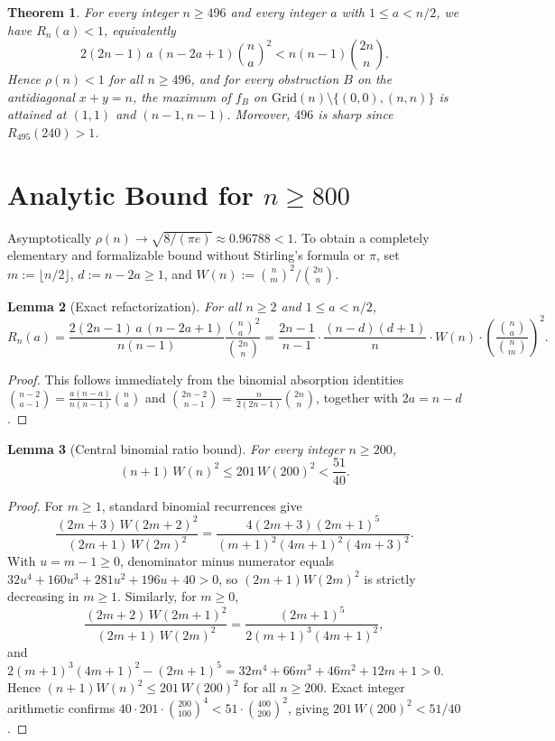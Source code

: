 \documentclass[11pt]{article}
\newtheorem{theorem}{Theorem}
\newtheorem{lemma}[theorem]{Lemma}
\begin{document}
\begin{theorem}\label{thm:main}
For every integer $n \ge 496$ and every integer $a$ with $1 \le a < n/2$, we have $R_n(a) < 1$, equivalently
\[
2(2n-1)\,a\,(n-2a+1)\binom{n}{a}^2 < n(n-1)\binom{2n}{n}.
\]
Hence $\rho(n) < 1$ for all $n \ge 496$, and for every obstruction $B$ on the antidiagonal $x+y=n$, the maximum of $f_B$ on $\mathrm{Grid}(n)\setminus\{(0,0),(n,n)\}$ is attained at $(1,1)$ and $(n-1,n-1)$. Moreover, $496$ is sharp since $R_{495}(240) > 1$.
\end{theorem}

\section{Analytic Bound for $n \ge 800$}
Asymptotically $\rho(n) \to \sqrt{8/(\pi e)} \approx 0.96788 < 1$. To obtain a completely elementary and formalizable bound without Stirling's formula or $\pi$, set $m := \lfloor n/2 \rfloor$, $d := n - 2a \ge 1$, and $W(n) := \binom{n}{m}^2 / \binom{2n}{n}$.

\begin{lemma}[Exact refactorization]\label{lem:ref}
For all $n \ge 2$ and $1 \le a < n/2$,
\[
R_n(a) = \frac{2(2n-1)\,a\,(n-2a+1)}{n(n-1)}\frac{\binom{n}{a}^2}{\binom{2n}{n}} = \frac{2n-1}{n-1}\cdot \frac{(n-d)(d+1)}{n}\cdot W(n)\cdot \left(\frac{\binom{n}{a}}{\binom{n}{m}}\right)^2.
\]
\end{lemma}
\begin{proof}
This follows immediately from the binomial absorption identities $\binom{n-2}{a-1} = \frac{a(n-a)}{n(n-1)}\binom{n}{a}$ and $\binom{2n-2}{n-1} = \frac{n}{2(2n-1)}\binom{2n}{n}$, together with $2a = n - d$.
\end{proof}

\begin{lemma}[Central binomial ratio bound]\label{lem:W}
For every integer $n \ge 200$,
\[
(n+1)\,W(n)^2 \le 201\,W(200)^2 < \frac{51}{40}.
\]
\end{lemma}
\begin{proof}
For $m \ge 1$, standard binomial recurrences give
\[
\frac{(2m+3)\,W(2m+2)^2}{(2m+1)\,W(2m)^2} = \frac{4(2m+3)(2m+1)^5}{(m+1)^2(4m+1)^2(4m+3)^2}.
\]
With $u = m - 1 \ge 0$, denominator minus numerator equals $32u^4 + 160u^3 + 281u^2 + 196u + 40 > 0$, so $(2m+1)W(2m)^2$ is strictly decreasing in $m \ge 1$. Similarly, for $m \ge 0$,
\[
\frac{(2m+2)\,W(2m+1)^2}{(2m+1)\,W(2m)^2} = \frac{(2m+1)^5}{2(m+1)^3(4m+1)^2},
\]
and $2(m+1)^3(4m+1)^2 - (2m+1)^5 = 32m^4 + 66m^3 + 46m^2 + 12m + 1 > 0$. Hence $(n+1)W(n)^2 \le 201\,W(200)^2$ for all $n \ge 200$. Exact integer arithmetic confirms $40 \cdot 201 \cdot \binom{200}{100}^4 < 51 \cdot \binom{400}{200}^2$, giving $201\,W(200)^2 < 51/40$.
\end{proof}
\end{document}
